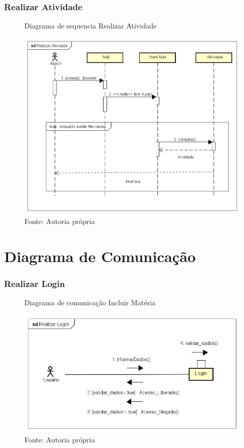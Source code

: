 \documentclass{utfpr-pg}
\begin{document}
    \subsection{Realizar Atividade}
        \begin{figure}[H]
            \centering
            \captionsetup{width=0.9\textwidth}
            \caption{Diagrama de sequencia Realizar Atividade}
            \includegraphics[width=0.95\linewidth]{fotos/seq3.png}
            \caption*{Fonte: Autoria própria}
            \label{fig:Diagrama de Classes}
        \end{figure}
    
\chapter{Diagrama de Comunicação}
    \label{chapter:diagrama de comunicacao}
    \subsection{Realizar Login}
        \begin{figure}[H]
            \centering
            \captionsetup{width=0.9\textwidth}
            \caption{Diagrama de comunicação Incluir Matéria}
            \includegraphics[width=0.95\linewidth]{fotos/com11.png}
            \caption*{Fonte: Autoria própria}
            \label{fig:Diagrama de Classes}
        \end{figure}
\end{document}
